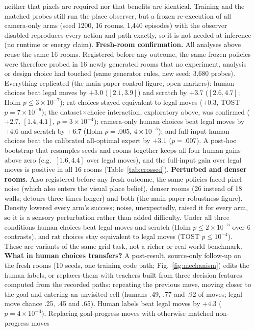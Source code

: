 \documentclass[10pt,onecolumn,letterpaper]{article}
\begin{document}
neither that pixels are required nor that benefits are identical. Training and the matched probes still run the place
observer, but a frozen re-execution of all camera-only arms (seed 1200, 16 rooms, 1,440 episodes) with the observer
disabled reproduces every action and path exactly, so it is not needed at inference (no runtime or energy claim).
\textbf{Fresh-room confirmation.} All analyses above reuse the same 16 rooms. Registered before any outcome, the
same frozen policies were therefore probed in 16 newly generated rooms that no experiment, analysis or design choice
had touched (same generator rules, new seed; 3,680 probes). Everything replicated (the main-paper control figure, open
markers): human choices beat legal moves by $+3.0$ ($[2.1,3.9]$) and scratch by $+3.7$ ($[2.6,4.7]$; Holm
$p\leq3\times10^{-7}$); rat choices stayed equivalent to legal moves ($+0.3$, TOST $p=7\times10^{-6}$); the
dataset$\times$choice interaction, exploratory above, was confirmed ($+2.7$, $[1.4,4.1]$, $p=3\times10^{-4}$);
camera-only human choices beat legal moves by $+4.6$ and scratch by $+6.7$ (Holm $p=.005$, $4\times10^{-5}$); and
full-input human choices beat the calibrated all-optimal expert by $+3.1$ ($p=.007$). A post-hoc bootstrap that resamples seeds and rooms together keeps all four human gains above zero (e.g.\ $[1.6,4.4]$ over legal moves), and the full-input gain over legal moves is positive in all 16 rooms (Table~\ref{tab:crossed}).
\textbf{Perturbed and denser rooms.} Also registered before any fresh outcome, the same policies faced pixel noise
(which also enters the visual place belief), denser rooms (26 instead of 18 walls; detours three times longer) and
both (the main-paper robustness figure). Density lowered every arm's success; noise, unexpectedly, raised it for every arm, so it
is a sensory perturbation rather than added difficulty. Under all three conditions human choices beat legal moves and
scratch (Holm $p\leq2\times10^{-5}$ over 6 contrasts), and rat choices stay equivalent to legal moves (TOST
$p\leq10^{-4}$). These are variants of the same grid task, not a richer or real-world benchmark.
\textbf{What in human choices transfers?} A post-result, source-only follow-up on the fresh rooms (10 seeds, one
training code path; Fig.~\ref{fig:mechanism}) edits the human labels, or replaces them with teachers built from three
decision features computed from the recorded paths: repeating the previous move, moving closer to the goal and
entering an unvisited cell (humans .49, .77 and .92 of moves; legal-move chance .25, .45 and .65). Human labels beat
legal moves by $+4.3$ ($p=4\times10^{-4}$). Replacing goal-progress moves with otherwise matched non-progress moves
\end{document}
